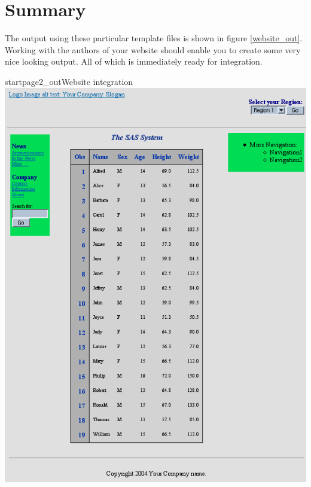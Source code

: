 \section{Summary}
The output using these particular template files is shown 
in figure \vref{website_out}.  
Working with the authors of your website should enable you to create some very
nice looking output.  All of which is immediately ready for integration.
        
\begin{goutput}{startpage2_out}{Website integration}
\includegraphics[width=6in]{website.png}
\end{goutput}
